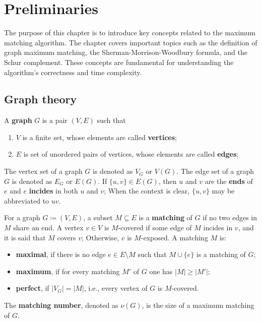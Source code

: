 \renewcommand*{\proofname}{Proof}

\chapter{Preliminaries}
\label{chap:preliminaries}

The purpose of this chapter is to introduce key concepts related to the maximum matching algorithm. 
The chapter covers important topics such as the definition of graph maximum matching, the Sherman-Morrison-Woodbury formula, and the Schur complement. 
These concepts are fundamental for understanding the algorithm's correctness and time complexity.

\enlargethispage{.5\baselineskip}

\section{Graph theory}
\label{sec:graph}

\begin{definition}[Graph]
\label{def:graph}
	A \textbf{graph} \(G\) is a pair \((V, E)\) such that
	\begin{enumerate}[label=(\roman*)]
		\item \(V\) is a finite set, whose elements are called \textbf{vertices};
		\item \(E\) is set of unordered pairs of vertices, whose elements are called \textbf{edges};
	\end{enumerate}
\end{definition}
\noindent
The vertex set of a graph \(G\) is denoted as \(V_G\) or \(V(G)\).
The edge set of a graph \(G\) is denoted as \(E_G\) or \(E(G)\).
If \(\{u,v\} \in E(G)\), then \(u\) and \(v\) are the \textbf{ends} of \(e\) and \(e\) \textbf{incides} in both \(u\) and \(v\);
When the context is clear, \(\{u, v\}\) may be abbreviated to \(uv\).

\begin{definition}[Matching]
\label{def:matching}
	For a graph \(G \coloneqq (V, E)\), a subset \(M \subseteq E\) is a \textbf{matching} of \(G\) if no two edges in \(M\) share an end.
	A vertex \(v \in V\) is \(M\)-covered if some edge of \(M\) incides in \(v\), 
	and it is said that \(M\) covers \(v\);
	Otherwise, \(v\) is \(M\)-exposed.
	A matching \(M\) is:
	\begin{itemize}
		\item 
			\textbf{maximal}, if there is no edge \(e \in E \setminus M\) such that \(M \cup \{e\}\) is a matching of \(G\);
		\item
			\textbf{maximum}, if for every matching \(M'\) of \(G\) one has \(|M| \geq |M'|\);
		\item
			\textbf{perfect}, if \(|V_G| = |M|\), i.e., every vertex of \(G\) is \(M\)-covered.
	\end{itemize}
	The \textbf{matching number}, denoted as \(\nu(G)\), is the size of a maximum matching of \(G\).
\end{definition}

